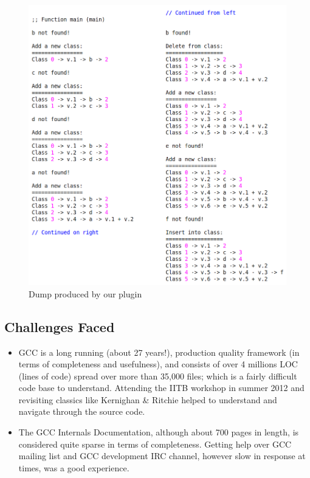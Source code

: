 \begin{figure}[htb]
\centering
\includegraphics{./sagvn}
\caption{Dump produced by our plugin}
\label{fig:sagvn}
\end{figure}

\pagebreak
\subsection{Challenges Faced}
\begin{itemize}
	\item GCC is a long running (about 27 years!), production quality framework (in terms of completeness and usefulness),  and consists of over 4 millions LOC (lines of code) spread over more than 35,000 files\cite{grc}; which is a fairly difficult code base to understand. Attending the IITB workshop\cite{grc} in summer 2012 and revisiting classics like Kernighan \& Ritchie\cite{kandr} helped to understand and navigate through the source code.
	\item The GCC Internals Documentation\cite{gccint}, although about 700 pages in length, is considered quite sparse in terms of completeness. Getting help over GCC mailing list\cite{gcc-ml} and GCC development IRC channel\cite{gcc-irc}, however slow in response at times, was a good experience.
\end{itemize}
